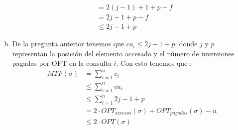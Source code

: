\documentclass[dcc,uchile]{fcfmcourse}
\begin{document}
\begin{problems}
\begin{enumerate}[(a)]
\begin{align*}
        &= 2(j - 1) + 1 + p -f\\
        &= 2j -1 + p - f\\
        &\le 2j -1 + p
    \end{align*}
\item De la pregunta anterior tenemos que  $ca_{i} \le 2j - 1 + p$, donde $j$ y $p$ representan la posición del elemento accesado y el número de inversiones pagadas por OPT en la consulta $i$. Con esto tenemos que :
\begin{align*}
    MTF(\sigma) &= \sum_{i=1}^n c_{i}\\
    &\le \sum_{i=1}^n ca_{i}\\
    &\le \sum_{i=1}^n 2j - 1 + p\\
    &= 2\cdot OPT_{accesos}(\sigma) + OPT_{pagados}(\sigma) - n\\
    &\le 2\cdot OPT(\sigma)
\end{align*}
\end{enumerate}

\end{problems}
\end{document}
